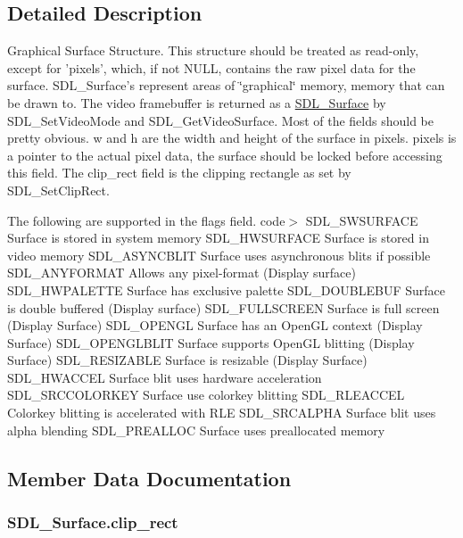 \subsection{Detailed Description}
Graphical Surface Structure. This structure should be treated as read-\/only, except for 'pixels', which, if not NULL, contains the raw pixel data for the surface. SDL\_\-Surface's represent areas of \char`\"{}graphical\char`\"{} memory, memory that can be drawn to. The video framebuffer is returned as a \hyperlink{struct_s_d_l___surface}{SDL\_\-Surface} by SDL\_\-SetVideoMode and SDL\_\-GetVideoSurface. Most of the fields should be pretty obvious. w and h are the width and height of the surface in pixels. pixels is a pointer to the actual pixel data, the surface should be locked before accessing this field. The clip\_\-rect field is the clipping rectangle as set by SDL\_\-SetClipRect.

The following are supported in the flags field. code$>$ SDL\_\-SWSURFACE Surface is stored in system memory SDL\_\-HWSURFACE Surface is stored in video memory SDL\_\-ASYNCBLIT Surface uses asynchronous blits if possible SDL\_\-ANYFORMAT Allows any pixel-\/format (Display surface) SDL\_\-HWPALETTE Surface has exclusive palette SDL\_\-DOUBLEBUF Surface is double buffered (Display surface) SDL\_\-FULLSCREEN Surface is full screen (Display Surface) SDL\_\-OPENGL Surface has an OpenGL context (Display Surface) SDL\_\-OPENGLBLIT Surface supports OpenGL blitting (Display Surface) SDL\_\-RESIZABLE Surface is resizable (Display Surface) SDL\_\-HWACCEL Surface blit uses hardware acceleration SDL\_\-SRCCOLORKEY Surface use colorkey blitting SDL\_\-RLEACCEL Colorkey blitting is accelerated with RLE SDL\_\-SRCALPHA Surface blit uses alpha blending SDL\_\-PREALLOC Surface uses preallocated memory 

\subsection{Member Data Documentation}
\hypertarget{struct_s_d_l___surface_a81af31ca468e945890d6ba93743aca4a}{
\subsubsection[{clip\_\-rect}]{ {\bf SDL\_\-Surface.clip\_\-rect}}}
\label{struct_s_d_l___surface_a81af31ca468e945890d6ba93743aca4a}


